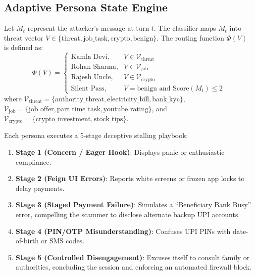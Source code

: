 \documentclass[conference]{IEEEtran}
\begin{document}
\subsection{Adaptive Persona State Engine}
Let $M_t$ represent the attacker's message at turn $t$. The classifier maps $M_t$ into threat vector $V \in \{\text{threat}, \text{job\_task}, \text{crypto}, \text{benign}\}$. The routing function $\Phi(V)$ is defined as:
\begin{equation}
\Phi(V) = \begin{cases} 
\text{Kamla Devi}, & V \in \mathcal{V}_{\text{threat}} \\ 
\text{Rohan Sharma}, & V \in \mathcal{V}_{\text{job}} \\ 
\text{Rajesh Uncle}, & V \in \mathcal{V}_{\text{crypto}} \\ 
\text{Silent Pass}, & V = \text{benign and } \text{Score}(M_t) \le 2 
\end{cases}
\end{equation}
where $\mathcal{V}_{\text{threat}} = \{\text{authority\_threat}, \text{electricity\_bill}, \text{bank\_kyc}\}$, $\mathcal{V}_{\text{job}} = \{\text{job\_offer}, \text{part\_time\_task}, \text{youtube\_rating}\}$, and $\mathcal{V}_{\text{crypto}} = \{\text{crypto\_investment}, \text{stock\_tips}\}$.

Each persona executes a 5-stage deceptive stalling playbook:
\begin{enumerate}
    \item \textbf{Stage 1 (Concern / Eager Hook)}: Displays panic or enthusiastic compliance.
    \item \textbf{Stage 2 (Feign UI Errors)}: Reports white screens or frozen app locks to delay payments.
    \item \textbf{Stage 3 (Staged Payment Failure)}: Simulates a ``Beneficiary Bank Busy'' error, compelling the scammer to disclose alternate backup UPI accounts.
    \item \textbf{Stage 4 (PIN/OTP Misunderstanding)}: Confuses UPI PINs with date-of-birth or SMS codes.
    \item \textbf{Stage 5 (Controlled Disengagement)}: Excuses itself to consult family or authorities, concluding the session and enforcing an automated firewall block.
\end{enumerate}
\end{document}
